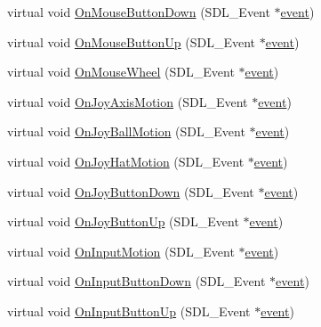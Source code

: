 \begin{DoxyCompactItemize}
\item 
virtual void \hyperlink{class_d_k_event_a0428b81f313a78d9fd29b768c82b0ae9}{On\-Mouse\-Button\-Down} (S\-D\-L\-\_\-\-Event $\ast$\hyperlink{class_d_k_event_a3deebb932ed734363c4ece87971bc45f}{event})
\item 
virtual void \hyperlink{class_d_k_event_a7add2973c846d6eef70cb56a26843e0e}{On\-Mouse\-Button\-Up} (S\-D\-L\-\_\-\-Event $\ast$\hyperlink{class_d_k_event_a3deebb932ed734363c4ece87971bc45f}{event})
\item 
virtual void \hyperlink{class_d_k_event_aa6be7b19a10cd40ebfca39049c807e1e}{On\-Mouse\-Wheel} (S\-D\-L\-\_\-\-Event $\ast$\hyperlink{class_d_k_event_a3deebb932ed734363c4ece87971bc45f}{event})
\item 
virtual void \hyperlink{class_d_k_event_a20bce6cd9b565abd0e9b72551e65e67d}{On\-Joy\-Axis\-Motion} (S\-D\-L\-\_\-\-Event $\ast$\hyperlink{class_d_k_event_a3deebb932ed734363c4ece87971bc45f}{event})
\item 
virtual void \hyperlink{class_d_k_event_a1d934761e41139737d56d2d57c7f030d}{On\-Joy\-Ball\-Motion} (S\-D\-L\-\_\-\-Event $\ast$\hyperlink{class_d_k_event_a3deebb932ed734363c4ece87971bc45f}{event})
\item 
virtual void \hyperlink{class_d_k_event_a5a904be0e1deec4b104da18c66f0a71e}{On\-Joy\-Hat\-Motion} (S\-D\-L\-\_\-\-Event $\ast$\hyperlink{class_d_k_event_a3deebb932ed734363c4ece87971bc45f}{event})
\item 
virtual void \hyperlink{class_d_k_event_a268a979be353aece330f3174ebb22603}{On\-Joy\-Button\-Down} (S\-D\-L\-\_\-\-Event $\ast$\hyperlink{class_d_k_event_a3deebb932ed734363c4ece87971bc45f}{event})
\item 
virtual void \hyperlink{class_d_k_event_a77b081bbcd263216872eb70dc8206c9b}{On\-Joy\-Button\-Up} (S\-D\-L\-\_\-\-Event $\ast$\hyperlink{class_d_k_event_a3deebb932ed734363c4ece87971bc45f}{event})
\item 
virtual void \hyperlink{class_d_k_event_a5c0756d9b7b5861bdd45530cf98f39d5}{On\-Input\-Motion} (S\-D\-L\-\_\-\-Event $\ast$\hyperlink{class_d_k_event_a3deebb932ed734363c4ece87971bc45f}{event})
\item 
virtual void \hyperlink{class_d_k_event_aad2b05f6a355cfb73b79fc63ee2780b4}{On\-Input\-Button\-Down} (S\-D\-L\-\_\-\-Event $\ast$\hyperlink{class_d_k_event_a3deebb932ed734363c4ece87971bc45f}{event})
\item 
virtual void \hyperlink{class_d_k_event_acce3d00b17b3bc9ae4d0feae6ef00eef}{On\-Input\-Button\-Up} (S\-D\-L\-\_\-\-Event $\ast$\hyperlink{class_d_k_event_a3deebb932ed734363c4ece87971bc45f}{event})

\end{DoxyCompactItemize}
